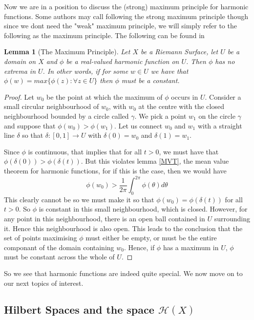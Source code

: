 \documentclass[11pt]{report}
\newtheorem{lemma}[thm]{Lemma}
\theoremstyle{definition}
\begin{document}
Now we are in a position to discuss the (strong) maximum principle for harmonic functions. Some authors may call following the strong maximum principle though since we dont need the "weak" maximum principle, we will simply refer to the following as the maximum principle.
The following can be found in \cite{arnold}
\begin{lemma}[The Maximum Principle]\label{MaximumPrincipleDef}
  Let $X$ be a Riemann Surface, let $U$ be a domain on $X$ and $\phi$ be a real-valued harmonic function on $U$. Then $\phi$ has no extrema in $U$. In other words, if for some $w \in U$ we have that $\phi(w) = max\{\phi(z) \colon \forall z \in U\}$ then $\phi$ must be a constant.
\end{lemma}
\begin{proof}
  Let $w_0$ be the point at which the maximum of $\phi$ occurs in $U$. Consider a small circular neighbourhood of $w_0$, with $w_0$ at the centre with the closed neighbourhood bounded by a circle called $\gamma$. We pick a point $w_1$ on the circle $\gamma$ and suppose that $\phi(w_0)>\phi(w_1)$. Let us connect $w_0$ and $w_1$ with a straight line $\delta$ so that $\delta:[0,1] \rightarrow U$ with $\delta(0)=w_0$ and $\delta(1)=w_1$.
  
  Since $\phi$ is continuous, that implies that for all $t > 0$, we must have that $\phi(\delta(0)) > \phi(\delta(t))$. But this violates lemma \ref{MVT}, the mean value theorem for harmonic functions, for if this is the case, then we would have 
  \[ \phi(w_0) > \frac{1}{2\pi}\int_0^{2\pi}\phi(\theta)d\theta \]
  This clearly cannot be so we must make it so that $\phi(w_0) = \phi(\delta(t))$ for all $t > 0$. So $\phi$ is constant in this small neighbourhood, which is closed. However, for any point in this neighbourhood, there is an open ball contained in $U$ surrounding it. Hence this neighbourhood is also open. This leads to the conclusion that the set of points maximising $\phi$ must either be empty, or must be the entire componant of the domain containing $w_0$. Hence, if $\phi$ has a maximum in $U$, $\phi$ must be constant across the whole of $U$.
\end{proof}

So we see that harmonic functions are indeed quite special. We now move on to our next topics of interest.

\subsection{Hilbert Spaces and the space $\mathcal{H}(X)$}
\end{document}
